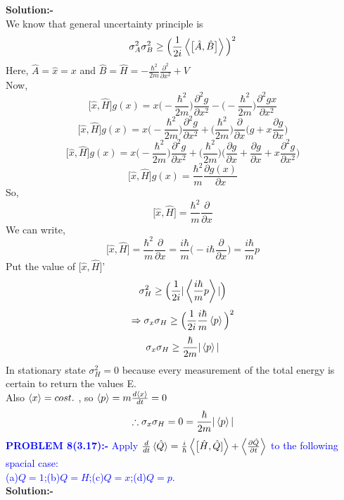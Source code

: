   \textbf{Solution:-}\\
  \hspace*{2cm} We know that general  uncertainty principle is $$\sigma_{A}^{2}\sigma_{B}^{2}\geq\Big(\frac{1}{2i}\Braket{\big[\hat{A},\hat{B}\big]}\Big)^2$$
  Here, $\hat{A}=\hat{x}=x$ and $\hat{B}=\hat{H}=-\frac{{\hbar}^2}{2m}\frac{{\partial}^2}{\partial x^2}+V$\\
  Now,\\
  $$\big[\hat{x},\hat{H}\big]g(x)=x\Big(-\frac{{\hbar}^2}{2m}\Big)\frac{{\partial}^2{g}}{\partial {x^2}}-\Big(-\frac{{\hbar}^2}{2m}\Big)\frac{{\partial}^2{gx}}{\partial x^2}$$
  $$\big[\hat{x},\hat{H}\big]g(x)=x\Big(-\frac{{\hbar}^2}{2m}\Big)\frac{{\partial}^2{g}}{\partial {x^2}}+\Big(\frac{{\hbar}^2}{2m}\Big)\frac{{\partial}}{\partial x}\Big(g+{x}\frac{{\partial}g}{\partial x}\Big)$$
   $$\big[\hat{x},\hat{H}\big]g(x)=x\Big(-\frac{{\hbar}^2}{2m}\Big)\frac{{\partial}^2{g}}{\partial {x^2}}+\Big(\frac{{\hbar}^2}{2m}\Big)\Big(\frac{{\partial}g}{\partial x}+\frac{{\partial}g}{\partial x}+{x}\frac{{\partial}^2g}{\partial x^2}\Big)$$
  $$\big[\hat{x},\hat{H}\big]g(x)=\frac{{\hbar}^2}{m}\frac{{\partial}g(x)}{\partial x}$$
  So,\\
  $$\big[\hat{x},\hat{H}\big]=\frac{{\hbar}^2}{m}\frac{{\partial}}{\partial x}$$
  We can write,\\
  $$\big[\hat{x},\hat{H}\big]=\frac{{\hbar}^2}{m}\frac{{\partial}}{\partial x}=\frac{i\hbar}{m}\Big(-i\hbar\frac{{\partial}}{\partial x}\Big)=\frac{i\hbar}{m}{p}$$
  Put the value of $\big[\hat{x},\hat{H}\big]$'\\
  $$\sigma_{H}^{2}\geq\Big(\frac{1}{2i}|\Braket{\frac{i\hbar}{m}{p}}|\Big)$$  
    $$\Rightarrow \sigma_{x}\sigma_{H}\geq\Big(\frac{1}{2i}\frac{i\hbar}{m}\Braket{{p}}\Big)^2$$
    $$\sigma_{x}\sigma_{H}\geq\frac{\hbar}{2m}|\Braket{{p}}|$$
    In stationary state $\sigma_{H}^{2}=0$ because every measurement of the total energy is certain to return the values E.\\
    Also $\Braket{x}=cost.$ , so $\Braket{p}=m\frac{d\Braket{x}}{dt}=0$\\
    $$\therefore  \sigma_{x}\sigma_{H}=0=\frac{\hbar}{2m}|\Braket{{p}}|$$
    \newpage
    \textcolor{blue}{ \textbf{PROBLEM 8(3.17):-} Apply   $\frac{d}{dt}\braket{\Hat{Q}}=\frac{i}{\hbar}\Braket{\big[\hat{H},\hat{Q}]}+\Braket{\frac{\partial{\hat{Q}}}{\partial{t}}}$ to the following spacial case:\\
 (a)$Q=1$;(b)$Q=H$;(c)$Q=x$;(d)$Q=p$.}\\
 \textbf{Solution:-}\\  
